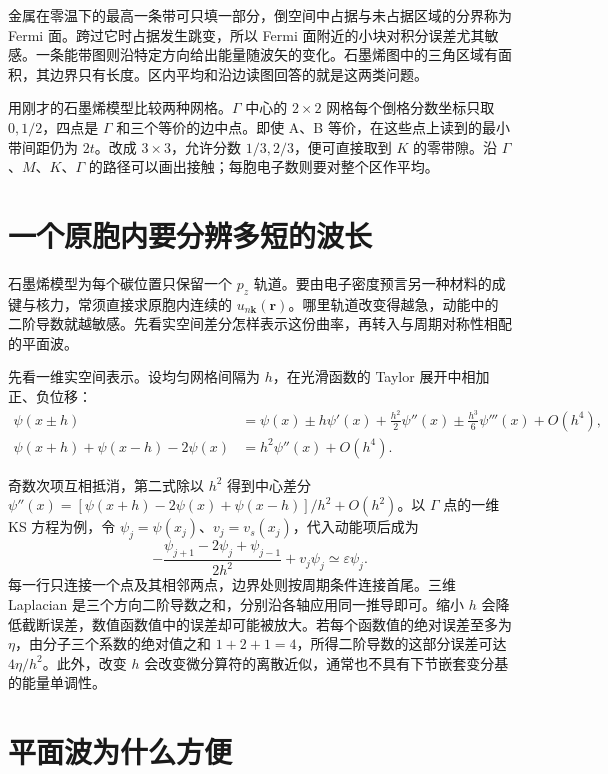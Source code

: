 金属在零温下的最高一条带可只填一部分，倒空间中占据与未占据区域的分界称为 Fermi 面。跨过它时占据发生跳变，所以 Fermi 面附近的小块对积分误差尤其敏感。一条能带图则沿特定方向给出能量随波矢的变化。石墨烯图中的三角区域有面积，其边界只有长度。区内平均和沿边读图回答的就是这两类问题。

用刚才的石墨烯模型比较两种网格。$\Gamma$ 中心的 $2\times2$ 网格每个倒格分数坐标只取 $0,1/2$，四点是 $\Gamma$ 和三个等价的边中点。即使 A、B 等价，在这些点上读到的最小带间距仍为 $2t$。改成 $3\times3$，允许分数 $1/3,2/3$，便可直接取到 $K$ 的零带隙。沿 $\Gamma$、$M$、$K$、$\Gamma$ 的路径可以画出接触；每胞电子数则要对整个区作平均。


\section{一个原胞内要分辨多短的波长}
石墨烯模型为每个碳位置只保留一个 $p_z$ 轨道。要由电子密度预言另一种材料的成键与核力，常须直接求原胞内连续的 $u_{n\bm k}(\bm r)$。哪里轨道改变得越急，动能中的二阶导数就越敏感。先看实空间差分怎样表示这份曲率，再转入与周期对称性相配的平面波。

\begin{samepage}
先看一维实空间表示。设均匀网格间隔为 $h$，在光滑函数的 Taylor 展开中相加正、负位移：
\begin{align}
\psi(x\pm h)&=\psi(x)\pm h\psi'(x)+\frac{h^2}{2}\psi''(x)
\pm\frac{h^3}{6}\psi'''(x)+O(h^4),\\
\psi(x+h)+\psi(x-h)-2\psi(x)&=h^2\psi''(x)+O(h^4).
\end{align}
\end{samepage}
奇数次项互相抵消，第二式除以 $h^2$ 得到中心差分 $\psi''(x)=[\psi(x+h)-2\psi(x)+\psi(x-h)]/h^2+O(h^2)$。以 $\Gamma$ 点的一维 KS 方程为例，令 $\psi_j=\psi(x_j)$、$v_j=v_s(x_j)$，代入动能项后成为
\begin{equation}
-\frac{\psi_{j+1}-2\psi_j+\psi_{j-1}}{2h^2}+v_j\psi_j
\simeq\varepsilon\psi_j.
\end{equation}
每一行只连接一个点及其相邻两点，边界处则按周期条件连接首尾。三维 Laplacian 是三个方向二阶导数之和，分别沿各轴应用同一推导即可。缩小 $h$ 会降低截断误差，数值函数值中的误差却可能被放大。若每个函数值的绝对误差至多为 $\eta$，由分子三个系数的绝对值之和 $1+2+1=4$，所得二阶导数的这部分误差可达 $4\eta/h^2$。此外，改变 $h$ 会改变微分算符的离散近似，通常也不具有下节嵌套变分基的能量单调性。

\section{平面波为什么方便}
